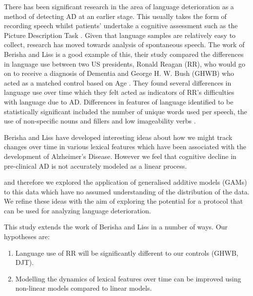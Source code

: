 \documentclass[12pt]{article}
\begin{document}
\par 
There has been significant research in the area of language deterioration as a method of detecting AD at an earlier stage. This usually takes the form of recording speech whilst patients' undertake a cognitive assessment such as the Picture Description Task \cite{Fraser2015}. Given that language samples are relatively easy to collect, research has moved towards analysis of spontaneous speech. The work of Berisha and Liss is a good example of this, their study compared the differences in language use between two US presidents, Ronald Reagan (RR), who would go on to receive a diagnosis of Dementia and George H. W. Bush (GHWB) who acted as a matched control based on Age \cite{Berisha2015}. They found several differences in language use over time which they felt acted as indicators of RR's difficulties with language due to AD. Differences in features of language identified to be statistically significant included the number of unique words used per speech, the use of non-specific nouns and fillers and low imageability verbs \cite{Berisha2015}. 
\par   
Berisha and Liss have developed interesting ideas about how we might track changes over time in various lexical features which have been associated with the development of Alzheimer's Disease. However we feel that cognitive decline in pre-clinical AD is not accurately modeled as a linear process.

 and therefore we explored the application of generalised additive models (GAMs) to this data which have no assumed understanding of the distribution of the data. We refine these ideas with the aim of exploring the potential for a protocol that can be used for analyzing language deterioration. 


This study extends the work of Berisha and Liss in a number of ways. Our hypotheses are:
\begin{enumerate}
	\item Language use of RR will be significantly different to our controls (GHWB, DJT).
	\item Modelling the dynamics of lexical features over time can be improved using non-linear models compared to linear models.
\end{enumerate}
\end{document}
